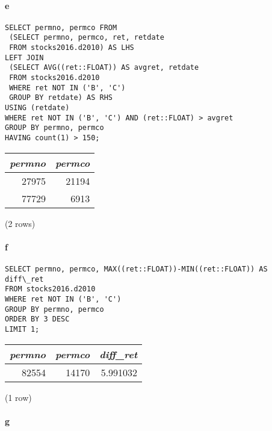 \documentclass[]{article}
\let\oldparagraph\paragraph
\renewcommand{\paragraph}[1]{\oldparagraph{#1}\mbox{}}
\begin{document}
\paragraph{e}

\color{blue}
\begin{verbatim}
SELECT permno, permco FROM
 (SELECT permno, permco, ret, retdate
 FROM stocks2016.d2010) AS LHS
LEFT JOIN
 (SELECT AVG((ret::FLOAT)) AS avgret, retdate
 FROM stocks2016.d2010
 WHERE ret NOT IN ('B', 'C')
 GROUP BY retdate) AS RHS
USING (retdate)
WHERE ret NOT IN ('B', 'C') AND (ret::FLOAT) > avgret
GROUP BY permno, permco
HAVING count(1) > 150;
\end{verbatim}
\color{black}

\begin{center}
\begin{tabular}{r | r}
\textit{permno} & \textit{permco} \\
\hline
27975 & 21194 \\
77729 & 6913 \\
\end{tabular}

\noindent (2 rows) \\
\end{center}

\paragraph{f}

\color{blue}
\begin{verbatim}
SELECT permno, permco, MAX((ret::FLOAT))-MIN((ret::FLOAT)) AS diff\_ret
FROM stocks2016.d2010
WHERE ret NOT IN ('B', 'C')
GROUP BY permno, permco
ORDER BY 3 DESC
LIMIT 1;
\end{verbatim}
\color{black}

\begin{center}
\begin{tabular}{r | r | r}
\textit{permno} & \textit{permco} & \textit{diff\_ret} \\
\hline
82554 & 14170 & 5.991032 \\
\end{tabular}

\noindent (1 row) \\
\end{center}

\paragraph{g}
\end{document}
